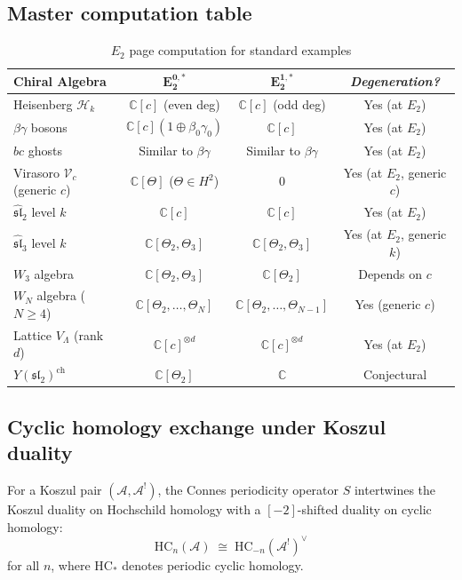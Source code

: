 \subsection{Master computation table}

\begin{table}[H]
\centering
\caption{\texorpdfstring{$E_2$}{E2} page computation for standard examples}
\begin{tabular}{|l|c|c|c|}
\hline
\textbf{Chiral Algebra} & $\mathbf{E_2^{0,*}}$ & $\mathbf{E_2^{1,*}}$ &
\emph{Degeneration?} \\
\hline
Heisenberg $\mathcal{H}_k$ & $\mathbb{C}[c]$ (even deg) & $\mathbb{C}[c]$ (odd deg) &
Yes (at $E_2$) \\
\hline
$\beta\gamma$ bosons & $\mathbb{C}[c](1 \oplus \beta_0\gamma_0)$ & $\mathbb{C}[c]$ &
Yes (at $E_2$) \\
\hline
$bc$ ghosts & Similar to $\beta\gamma$ & Similar to $\beta\gamma$ & Yes (at $E_2$) \\
\hline
Virasoro $\mathcal{V}_c$ (generic $c$) & $\mathbb{C}[\Theta]$ ($\Theta \in H^2$) & 0 &
Yes (at $E_2$, generic $c$) \\
\hline
$\widehat{\mathfrak{sl}}_2$ level $k$ & $\mathbb{C}[c]$ & $\mathbb{C}[c]$ & Yes (at $E_2$) \\
\hline
$\widehat{\mathfrak{sl}}_3$ level $k$ & $\mathbb{C}[\Theta_2, \Theta_3]$ & $\mathbb{C}[\Theta_2, \Theta_3]$ & Yes (at $E_2$, generic $k$) \\
\hline
$W_3$ algebra & $\mathbb{C}[\Theta_2, \Theta_3]$ & $\mathbb{C}[\Theta_2]$ & Depends on $c$ \\
\hline
$W_N$ algebra ($N \geq 4$) & $\mathbb{C}[\Theta_2, \ldots, \Theta_N]$ & $\mathbb{C}[\Theta_2, \ldots, \Theta_{N-1}]$ & Yes (generic $c$) \\
\hline
Lattice $V_\Lambda$ (rank $d$) & $\mathbb{C}[c]^{\otimes d}$ & $\mathbb{C}[c]^{\otimes d}$ & Yes (at $E_2$) \\
\hline
$Y(\mathfrak{sl}_2)^{\mathrm{ch}}$ & $\mathbb{C}[\Theta_2]$ & $\mathbb{C}$ & Conjectural \\
\hline
\end{tabular}
\end{table}

\subsection{Cyclic homology exchange under Koszul duality}

\begin{corollary}\label{cor:cyclic-homology-duality}
For a Koszul pair $(\mathcal{A}, \mathcal{A}^!)$, the Connes periodicity operator $S$ intertwines the Koszul duality on Hochschild homology with a $[-2]$-shifted duality on cyclic homology:
\begin{equation}\label{eq:cyclic-duality}
\mathrm{HC}_n(\mathcal{A}) \;\cong\; \mathrm{HC}_{-n}(\mathcal{A}^!)^{\vee}
\end{equation}
for all $n$, where $\mathrm{HC}_*$ denotes periodic cyclic homology.
\end{corollary}

